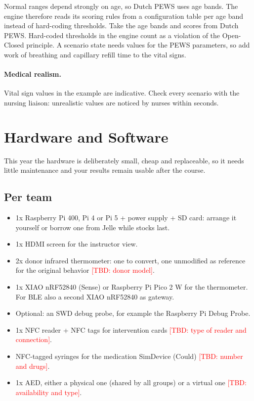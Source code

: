 \documentclass[11pt,a4paper]{article}
\newcommand{\tbd}[1]{\textcolor{red}{[TBD: #1]}}
\begin{document}
Normal ranges depend strongly on age, so Dutch PEWS uses age bands. The engine
therefore reads its scoring rules from a configuration table per age band
instead of hard-coding thresholds. Take the age bands and scores from Dutch PEWS.
Hard-coded thresholds in the engine count as a violation of the Open-Closed
principle. A scenario state needs values for the PEWS parameters, so add work
of breathing and capillary refill time to the vital signs.

\paragraph{Medical realism.}
Vital sign values in the example are indicative. Check every scenario with the
nursing liaison: unrealistic values are noticed by nurses within seconds.

\clearpage
\section{Hardware and Software}
This year the hardware is deliberately small, cheap and replaceable, so it
needs little maintenance and your results remain usable after the course.

\subsection*{Per team}
\begin{itemize}
  \item 1x Raspberry Pi 400, Pi 4 or Pi 5 + power supply + SD card: arrange it yourself or borrow one from Jelle while stocks last.
  \item 1x HDMI screen for the instructor view.
  \item 2x donor infrared thermometer: one to convert, one unmodified as reference for the original behavior \tbd{donor model}.
  \item 1x XIAO nRF52840 (Sense) or Raspberry Pi Pico 2 W for the thermometer. For BLE also a second XIAO nRF52840 as gateway.
  \item Optional: an SWD debug probe, for example the Raspberry Pi Debug Probe.
  \item 1x NFC reader + NFC tags for intervention cards \tbd{type of reader and connection}.
  \item NFC-tagged syringes for the medication SimDevice (Could) \tbd{number and drugs}.
  \item 1x AED, either a physical one (shared by all groups) or a virtual one \tbd{availability and type}.
\end{itemize}
\end{document}
